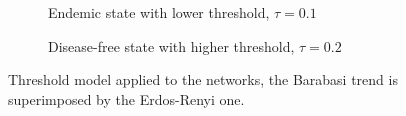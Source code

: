     \begin{figure}[htbp]
        \begin{subfigure}{0.45\textwidth}
            \caption{Endemic state with lower threshold, $\tau=0.1$}
        \end{subfigure}
        \begin{subfigure}{0.45\textwidth}
            \caption{Disease-free state with higher threshold, $\tau=0.2$ }
          \end{subfigure}
          \caption{Threshold model applied to the networks, the Barabasi trend is superimposed by the Erdos-Renyi one.}
      \label{diff_thr_total}
  \end{figure}


